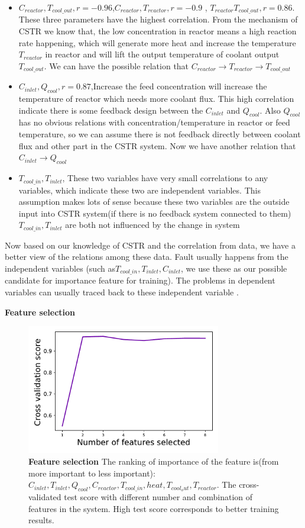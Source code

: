 \documentclass[fleqn,11pt]{wlscirep}
\begin{document}
\begin{itemize}
     \item {$C_{reactor} ,T_{cool\_out}, r=-0.96$,$C_{reactor} ,T_{reactor},r=-0.9$ ,  $T_{reactor} T_{cool\_out},r=0.86$. These three parameters have the highest correlation. From the mechanism of CSTR we know that, the low concentration in reactor means a high reaction rate happening, which will generate more heat and increase the temperature$T_{reactor}$ in reactor and will lift the output temperature of coolant output$T_{cool\_out}$. We can have the possible relation that  $C_{reactor} \rightarrow T_{reactor} \rightarrow T_{cool\_out} $ } 
      \item {$C_{inlet} ,Q_{cool}, r=0.87$,Increase the feed concentration will increase the temperature of reactor which needs more coolant flux. This high correlation indicate there is some feedback design between the $C_{inlet}$  and $ Q_{cool}$. Also $Q_{cool}$ has  no obvious relations with concentration/temperature in reactor or feed temperature, so we can assume there is not feedback directly between coolant flux and other part in the CSTR system. Now we have another relation that
      $C_{inlet} \rightarrow Q_{cool}$ } 
        \item {$T_{cool\_in} ,T_{inlet}$, These two variables have very small correlations to any variables, which indicate these two are independent variables. This assumption makes lots of sense because these two variables are the outside input into CSTR system(if there is no feedback system connected to them) $T_{cool\_in} ,T_{inlet}$ are both not influenced by the change in system } 
\end{itemize}
Now based on our knowledge of CSTR and the correlation from data, we have a better view of the relations among these data. Fault usually happens from the independent variables (such as$T_{cool\_in} ,T_{inlet}, C_{inlet}$, we use these as our possible candidate for importance feature for training). The problems in dependent variables can usually traced back to these independent variable . 

\textbf{Feature selection}
\begin{figure}[h]
    \centering
    \includegraphics[width=8.5cm]{figure4.pdf}
    \caption{
    \textbf{Feature selection} The ranking of importance of the feature is(from more important to less important): $C_{inlet}, T_{inlet}, Q_{cool}, C_{reactor}, T_{cool\_in}, heat, T_{cool_out}, T_{reactor}$. The cross-validated test score with different number and combination of  features in the system. High test score corresponds to better training results. }
    \label{fig:1}
\end{figure}
\end{document}
